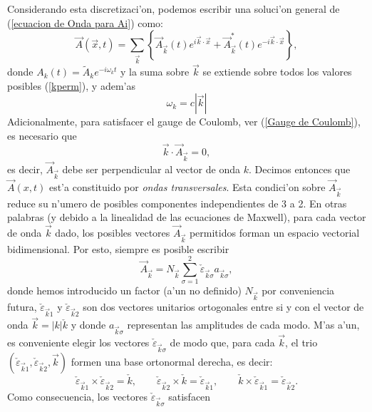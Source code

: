Considerando esta discretizaci'on, podemos escribir una soluci'on general de
(\ref{ecuacion de Onda para Ai}) como:
\begin{equation}
\vec{A}(\vec{x},t)=\sum_{\vec{k}}\left\{\vec{A}_{\vec{k}}(t)e^{i\vec{k}\cdot\vec
{x}}+\vec{A}_{\vec{k}}^*(t)e^{-i\vec{k}\cdot\vec{x}}\right\} , \label{solA}
\end{equation} 
donde $A_k(t)=\tilde{A}_k e^{-i\omega_kt}$ y la suma sobre $\vec{k}$ se extiende
sobre todos los valores posibles (\ref{kperm}), y adem'as
\begin{equation}
\omega_k=c|\vec{k}|
\end{equation} 
Adicionalmente, para satisfacer el gauge de Coulomb, ver (\ref{Gauge de
Coulomb}), es necesario que 
\begin{equation}
\vec{k}\cdot\vec{A}_{\vec{k}}=0 ,
\end{equation} 
es decir, $\vec{A}_{\vec{k}}$ debe ser perpendicular al vector de onda $k$.
Decimos entonces que  $\vec{A}(x,t)$ est'a constituido por \textit{ondas
transversales}. Esta condici'on sobre $\vec{A}_{\vec{k}}$ reduce su n'umero de
posibles componentes independientes de 3 a 2. En otras palabras (y debido a la
linealidad de las ecuaciones de Maxwell), para cada vector de onda $\vec{k}$
dado, los posibles vectores $\vec{A}_{\vec{k}}$ permitidos forman un espacio
vectorial bidimensional. Por esto, siempre es posible escribir 
\begin{equation}
\vec{A}_{\vec{k}}=N_{\vec{k}}\sum_{\sigma=1}^2
\check{\varepsilon}_{\vec{k}\sigma} a_{\vec{k}\sigma},
\end{equation} 
donde hemos introducido un factor (a'un no definido) $N_{\vec{k}}$ por
conveniencia futura, $\check{\varepsilon}_{\vec{k}1}$ y
$\check{\varepsilon}_{\vec{k}2}$ son dos vectores unitarios ortogonales entre si
y con el vector de onda $\vec{k}=|k|\check{k}$ y donde $a_{\vec{k}\sigma}$
representan las
amplitudes de cada modo. M'as a'un, es conveniente elegir los vectores
$\check{\varepsilon}_{\vec{k}\sigma}$ de modo que, para cada $\vec{k}$, el trio 
$\left(
\check{\varepsilon}_{\vec{k}1},\check{\varepsilon}_{\vec{k}2},\vec{k}\right)
$ formen una base ortonormal derecha, es decir:
\begin{equation}
\check{\varepsilon}_{\vec{k}1}\times\check{\varepsilon}_{\vec{k}2}=\check{k},
\qquad 
\check{\varepsilon}_{\vec{k}2}\times\check{k}=\check{\varepsilon}_{\vec{k}1},
\qquad
\check{k}\times\check{\varepsilon}_{\vec{k}1}=\check{\varepsilon}_{\vec{k}2}.
\end{equation}
Como consecuencia, los vectores $\check{\varepsilon}_{\vec{k}\sigma}$ satisfacen
